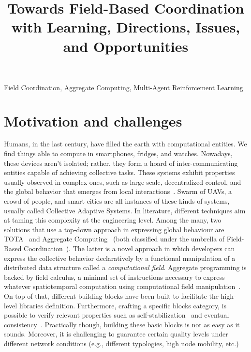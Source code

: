 \documentclass[conference]{IEEEtran}
\begin{document}
\title{Towards Field-Based Coordination with Learning, Directions, Issues, and Opportunities}

\author{
\and
{}
}

\maketitle

\begin{IEEEkeywords}
Field Coordination, Aggregate Computing, Multi-Agent Reinforcement Learning
\end{IEEEkeywords}

\section{Motivation and challenges}
Humans, in the last century, have filled the earth with computational entities. 
%
We find things able to compute in smartphones, fridges, and watches. %
Nowadays, these devices aren't isolated; rather, they form a hoard of inter-communicating entities capable of achieving collective tasks. 
These systems exhibit properties usually observed in complex ones, such as large scale, 
decentralized control, and the global behavior that emerges from local interactions~\cite{DBLP:conf/huc/Ferscha15}. 
Swarm of UAVs, a crowd of people, and smart cities are all instances of these kinds of systems, usually called Collective Adaptive Systems.
%
In literature, different techniques aim at taming this complexity at the engineering level.
Among the many, two solutions that use a top-down approach in expressing global behaviour are TOTA~\cite{DBLP:journals/tosem/MameiZ09} and Aggregate Computing~\cite{DBLP:journals/computer/BealPV15} (both classified under the umbrella of Field-Based Coordination~\cite{DBLP:books/daglib/0015276}).
The latter is a novel approach in which developers can express the collective behavior declaratively by
a functional manipulation of a distributed data structure called a \emph{computational field}.
Aggregate programming is backed by field calculus, a minimal set of instructions necessary to express whatever spatiotemporal computation using computational field manipulation~\cite{DBLP:conf/coordination/AudritoBDV18}. 
On top of that, different building blocks have been built to facilitate the high-level libraries definition.
Furthermore, crafting a specific blocks category, is possible to verify relevant properties such as self-stabilization~\cite{DBLP:conf/coordination/ViroliD14} and eventual consistency~\cite{DBLP:conf/saso/BealVPD16}.
Practically though, building these basic blocks is not as easy as it sounds. 
Moreover, it is challenging to guarantee certain quality levels under different network conditions (e.g., different typologies, high node mobility, etc.)
\end{document}
